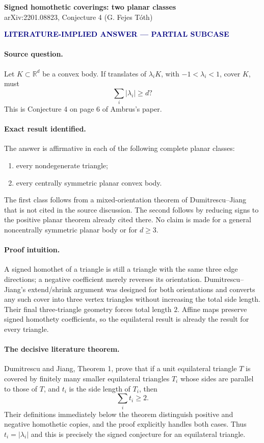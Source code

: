 \documentclass[10pt]{article}
\newcommand{\R}{\mathbb R}
\newcommand{\badge}[1]{\colorbox{soft}{\strut\textcolor{navy}{\bfseries #1}}}
\begin{document}
\begin{center}
  {\Large\bfseries Signed homothetic coverings: two planar classes}\\[3pt]
  {\small arXiv:2201.08823, Conjecture 4 (G. Fejes T\'oth)}\\[7pt]
  \badge{LITERATURE-IMPLIED ANSWER --- PARTIAL SUBCASE}
\end{center}

\paragraph{Source question.}
Let $K\subset\R^d$ be a convex body.  If translates of $\lambda_iK$, with
$-1<\lambda_i<1$, cover $K$, must
\[
       \sum_i |\lambda_i|\ge d?
\]
This is Conjecture 4 on page 6 of Ambrus's paper.

\paragraph{Exact result identified.}
The answer is affirmative in each of the following complete planar classes:
\begin{enumerate}
  \item every nondegenerate triangle;
  \item every centrally symmetric planar convex body.
\end{enumerate}
The first class follows from a mixed-orientation theorem of Dumitrescu--Jiang
that is not cited in the source discussion.  The second follows by reducing
signs to the positive planar theorem already cited there.  No claim is made
for a general noncentrally symmetric planar body or for $d\ge3$.

\paragraph{Proof intuition.}
A signed homothet of a triangle is still a triangle with the same three edge
directions; a negative coefficient merely reverses its orientation.
Dumitrescu--Jiang's extend/shrink argument was designed for both orientations
and converts any such cover into three vertex triangles without increasing
the total side length.  Their final three-triangle geometry forces total
length $2$.  Affine maps preserve signed homothety coefficients, so the
equilateral result is already the result for every triangle.

\paragraph{The decisive literature theorem.}
Dumitrescu and Jiang, Theorem 1, prove that if a unit equilateral triangle
$T$ is covered by finitely many smaller equilateral triangles $T_i$ whose
sides are parallel to those of $T$, and $t_i$ is the side length of $T_i$,
then
\[
       \sum_i t_i\ge2.
\]
Their definitions immediately below the theorem distinguish positive and
negative homothetic copies, and the proof explicitly handles both cases.
Thus $t_i=|\lambda_i|$ and this is precisely the signed conjecture for an
equilateral triangle.
\end{document}
